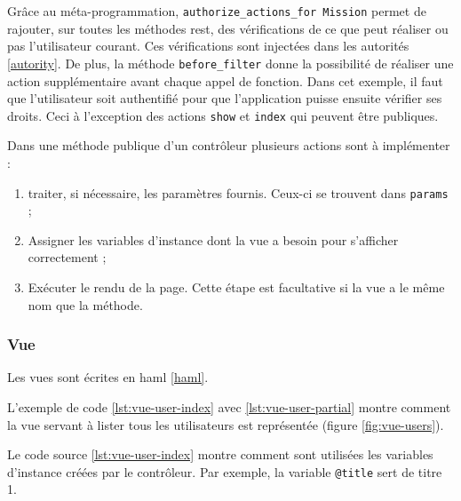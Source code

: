 \begin{figure}
\end{figure}

Grâce au méta-programmation, \lstinline[language=Rails]{authorize_actions_for Mission} permet de rajouter, sur toutes les méthodes \gls{rest}, des vérifications de ce que peut réaliser ou pas l'utilisateur courant. Ces vérifications sont injectées dans les autorités \ref{autority}. De plus, la méthode \lstinline[language=Rails]{before_filter} donne la possibilité de réaliser une action supplémentaire avant chaque appel de fonction. Dans cet exemple, il faut que l'utilisateur soit authentifié pour que l'application puisse ensuite vérifier ses droits. Ceci à l'exception des actions \texttt{show} et \texttt{index} qui peuvent être publiques.  

Dans une méthode publique d'un contrôleur plusieurs actions sont à implémenter :
\begin{enumerate}
  \item traiter, si nécessaire, les paramètres fournis. Ceux-ci se trouvent dans \lstinline[language=Rails]{params} ;
  \item Assigner les variables d'instance dont la vue a besoin pour s'afficher correctement ;
  \item Exécuter le rendu de la page. Cette étape est facultative si la vue a le même nom que la méthode.
\end{enumerate}

\subsubsection{Vue}
\label{vues}
Les vues sont écrites en haml \ref{haml}. 

L'exemple de code \ref{lst:vue-user-index} avec \ref{lst:vue-user-partial} montre comment la vue servant à lister tous les utilisateurs est représentée (figure \ref{fig:vue-users}).

\begin{figure}

\end{figure}

Le code source \ref{lst:vue-user-index} montre comment sont utilisées les variables d'instance créées par le contrôleur. Par exemple, la variable \texttt{@title} sert de titre 1.


